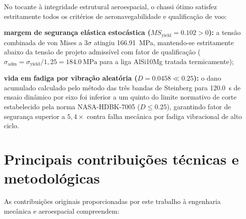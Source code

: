 No tocante à integridade estrutural aeroespacial, o chassi ótimo satisfez estritamente todos os critérios de aeronavegabilidade e qualificação de voo:
\begin{alineas}
  \item \textbf{margem de segurança elástica estocástica ($MS_{\text{yield}} = \num{+0.102} > 0$):} a tensão combinada de von Mises a $3\sigma$ atingiu \SI{166.91}{\mega\pascal}, mantendo-se estritamente abaixo da tensão de projeto admissível com fator de qualificação ($\sigma_{\text{adm}} = \sigma_{\text{yield}} / 1{,}25 = \SI{184.0}{\mega\pascal}$ para a liga AlSi10Mg tratada termicamente);
  \item \textbf{vida em fadiga por vibração aleatória ($D = \num{0.0458} \ll \num{0.25}$):} o dano acumulado calculado pelo método das três bandas de Steinberg para \SI{120.0}{\second} de ensaio dinâmico por eixo foi inferior a um quinto do limite normativo de corte estabelecido pela norma NASA-HDBK-7005 ($D \le \num{0.25}$), garantindo fator de segurança superior a $5{,}4\times$ contra falha mecânica por fadiga vibracional de alto ciclo.
\end{alineas}

\section{Principais contribuições técnicas e metodológicas}
\label{sec:contribuicoes}

As contribuições originais proporcionadas por este trabalho à engenharia mecânica e aeroespacial compreendem:

